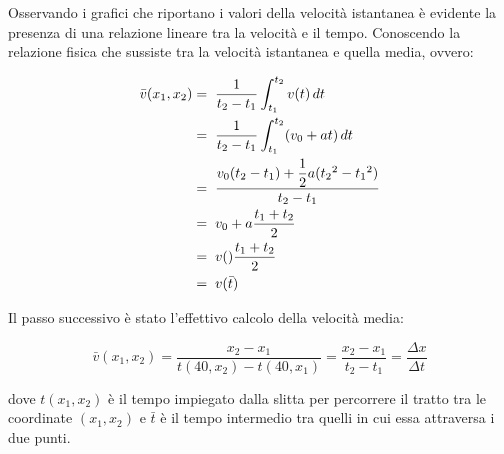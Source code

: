 \documentclass[a4paper,11pt,titlepage]{book}
\begin{document}
\begin{flushleft}
Osservando i grafici che riportano i valori della velocità istantanea è evidente la presenza di una relazione lineare tra la velocità e il tempo. Conoscendo la relazione fisica che sussiste tra la velocità istantanea e quella media, ovvero:
\end{flushleft}



\begin{equation}\begin{split}
\bar{v}(x_1,x_2)=&\hspace{0.2cm}\dfrac{1}{t_2-t_1}\int_{t_1}^{t_2} v(t)\, dt\\
=&\hspace{0.2cm}\dfrac{1}{t_2-t_1}\int_{t_1}^{t_2} (v_0+at)\, dt\\
=&\hspace{0.2cm}\dfrac{v_0(t_2-t_1)+\dfrac{1}{2}a({t_2}^2-{t_1}^2)}{t_2-t_1}\\
=&\hspace{0.2cm}v_0+a{\dfrac{t_1+t_2}{2}}\\
=&\hspace{0.2cm}v()\dfrac{t_1+t_2}{2}\\
=&\hspace{0.2cm}v(\bar{t})
\end{split}\end{equation}
\hspace{1cm}



\begin{flushleft}
Il passo successivo è stato l’effettivo calcolo della velocità media: 
\end{flushleft}
\vspace{1cm}

\begin{equation}
\bar{v}(x_1,x_2)=\dfrac{x_2-x_1}{t(40,x_2)-t(40,x_1)}=\dfrac{x_2-x_1}{t_2-t_1}=\dfrac{\Delta{x}}{\Delta{t}}
\end{equation}
\vspace{1cm}

\begin{flushleft}
dove $t(x_1,x_2)$ è il tempo impiegato dalla slitta per percorrere il tratto tra le coordinate $(x_1,x_2)$ e $\bar{t}$ è il tempo intermedio tra quelli in cui essa
attraversa i due punti.
\end{flushleft}
\vspace{0.2cm}



\newpage
 
\end{document}
